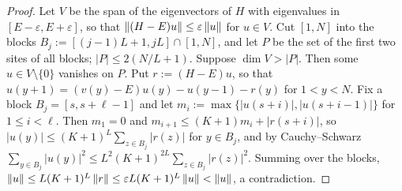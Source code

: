 \begin{proof}
Let $V$ be the span of the eigenvectors of $H$ with eigenvalues in $[E-\varepsilon,E+\varepsilon]$, so that
$\left\|(H-E)u\right\|\le\varepsilon\left\|u\right\|$ for $u\in V$.  Cut $[1,N]$ into the blocks
$B_j:=[(j-1)L+1,jL]\cap[1,N]$, and let $P$ be the set of the first two sites of all blocks; $|P|\le2(N/L+1)$.
Suppose $\dim V>|P|$.  Then some $u\in V\setminus\{0\}$ vanishes on $P$.  Put $r:=(H-E)u$, so that
$u(y+1)=(v(y)-E)u(y)-u(y-1)-r(y)$ for $1<y<N$.  Fix a block $B_j=[s,s+\ell-1]$ and let
$m_i:=\max\{|u(s+i)|,|u(s+i-1)|\}$ for $1\le i<\ell$.  Then $m_1=0$ and $m_{i+1}\le(K+1)m_i+|r(s+i)|$, so
$|u(y)|\le(K+1)^L\sum_{z\in B_j}|r(z)|$ for $y\in B_j$, and by Cauchy--Schwarz
$\sum_{y\in B_j}|u(y)|^2\le L^2(K+1)^{2L}\sum_{z\in B_j}|r(z)|^2$.  Summing over the blocks,
$\left\|u\right\|\le L(K+1)^L\left\|r\right\|\le\varepsilon L(K+1)^L\left\|u\right\|<\left\|u\right\|$, a contradiction.
\end{proof}

